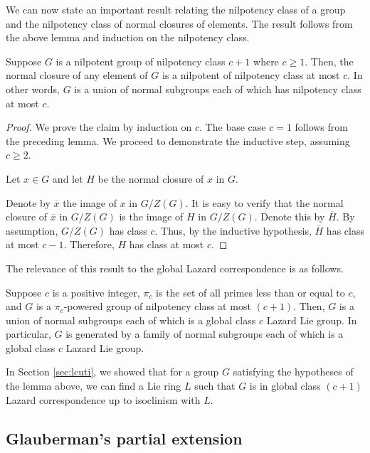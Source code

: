 \documentclass{ucetd}
\begin{document}
We can now state an important result relating the nilpotency class of
a group and the nilpotency class of normal closures of elements. The
result follows from the above lemma and induction on the nilpotency
class.

\begin{lemma}
  Suppose $G$ is a nilpotent group of nilpotency class $c + 1$ where $c
  \ge 1$. Then, the normal closure of any element of $G$ is a
  nilpotent of nilpotency class at most $c$. In other words, $G$
  is a union of normal subgroups each of which has nilpotency class at
  most $c$.
\end{lemma}

\begin{proof}
  We prove the claim by induction on $c$. The base case $c = 1$
  follows from the preceding lemma. We proceed to demonstrate the
  inductive step, assuming $c \ge 2$.

  Let $x \in G$ and let $H$ be the normal closure of $x$ in
  $G$.

  Denote by $\overline{x}$ the image of $x$ in $G/Z(G)$. It is easy to
  verify that the normal closure of $\overline{x}$ in $G/Z(G)$ is the
  image of $H$ in $G/Z(G)$. Denote this by $\overline{H}$. By
  assumption, $G/Z(G)$ has class $c$. Thus, by the inductive
  hypothesis, $\overline{H}$ has class at most $c - 1$. Therefore, $H$
  has class at most $c$.
\end{proof}

The relevance of this result to the global Lazard correspondence is as
follows.

\begin{lemma}
  Suppose $c$ is a positive integer, $\pi_c$ is the set of all primes
  less than or equal to $c$, and $G$ is a $\pi_c$-powered group of
  nilpotency class at most $(c + 1)$. Then, $G$ is a union of normal
  subgroups each of which is a global class $c$ Lazard Lie group. In
  particular, $G$ is generated by a family of normal subgroups each of
  which is a global class $c$ Lazard Lie group.
\end{lemma}
 
In Section \ref{sec:lcuti}, we showed that for a group $G$ satisfying
the hypotheses of the lemma above, we can find a Lie ring $L$ such
that $G$ is in global class $(c + 1)$ Lazard correspondence up to
isoclinism with $L$.

\subsection{Glauberman's partial extension}
\end{document}
